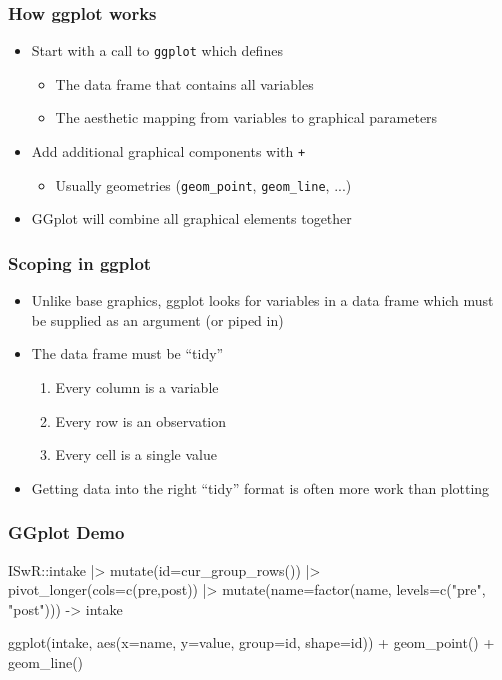 \documentclass[xcolor=svgnames]{beamer}
\let\overbatim\verbatim
\let\endoverbatim\endverbatim
\newenvironment{vcode}%
{\bgroup\baselineskip=0.8\baselineskip\overbatim}%
{\endoverbatim\egroup}
\begin{document}
\begin{frame}
  \frametitle{How ggplot works}

  \begin{itemize}
  \item Start with a call to \texttt{ggplot} which defines
  \begin{itemize}
  \item The data frame that contains all variables
  \item The aesthetic mapping from variables to graphical parameters
  \end{itemize}
  \item Add additional graphical components with \texttt{+}
  \begin{itemize}
  \item Usually geometries (\texttt{geom\_point}, \texttt{geom\_line}, ...)
  \end{itemize}
  \item GGplot will combine all graphical elements together
  \end{itemize}

\end{frame}

\begin{frame}
  \frametitle{Scoping in ggplot}

  \begin{itemize}
  \item Unlike base graphics, ggplot looks for variables in a data frame
  which must be supplied as an argument (or piped in)
  \item The data frame must be ``tidy''
  \begin{enumerate}
  \item Every column is a variable
  \item Every row is an observation
  \item Every cell is a single value
  \end{enumerate}
  \item Getting data into the right ``tidy'' format is often more work
  than plotting
  \end{itemize}

\end{frame}

\begin{frame}[fragile]
  \frametitle{GGplot Demo}

\small
\begin{vcode}
ISwR::intake |>
  mutate(id=cur_group_rows()) |>
  pivot_longer(cols=c(pre,post)) |>
  mutate(name=factor(name, levels=c("pre", "post"))) ->
  intake

ggplot(intake,
       aes(x=name, y=value, group=id, shape=id)) +
  geom_point() +
  geom_line()
\end{vcode}

\end{frame}
\end{document}

